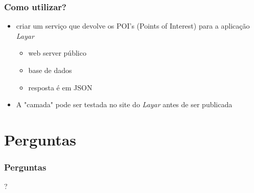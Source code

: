 \documentclass{beamer}
\begin{document}
\begin{frame} \frametitle{Como utilizar?}
\begin{itemize}
\pause \item criar um serviço que devolve os POI's (Points of Interest) para a aplicação \textit{Layar}
		\begin{itemize}
			\pause \item web server público
			\pause \item base de dados
			\pause \item resposta é em JSON
		\end{itemize}
\pause \item A "camada" pode ser testada no site do \textit{Layar} antes de ser publicada
\end{itemize}
\end{frame}


\section*{Perguntas}
\begin{frame} \frametitle{Perguntas}
\begin{center}\huge{?}\end{center}
\end{frame}
\end{document}
